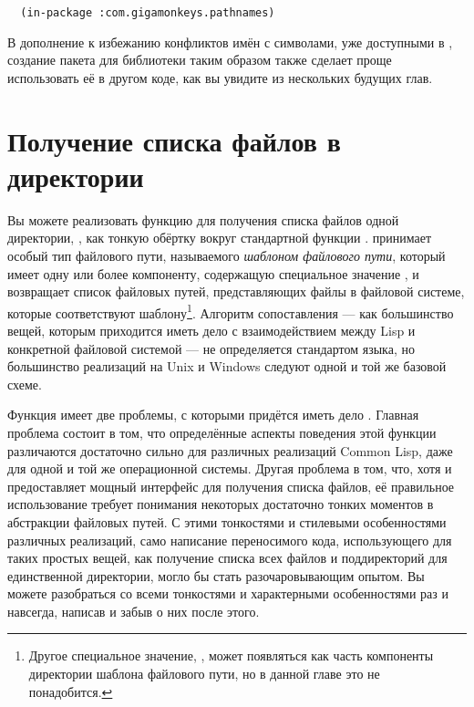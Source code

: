 \begin{lstlisting}
  (in-package :com.gigamonkeys.pathnames)
\end{lstlisting}

В дополнение к избежанию конфликтов имён с символами, уже доступными в ,
создание пакета для библиотеки таким образом также сделает проще использовать её в другом
коде, как вы увидите из нескольких будущих глав.


\section{Получение списка файлов в директории}

Вы можете реализовать функцию для получения списка файлов одной директории,
, как тонкую обёртку вокруг стандартной функции
.  принимает особый тип файлового пути, называемого
\textit{шаблоном файлового пути}, который имеет одну или более компоненту, содержащую
специальное значение , и возвращает список файловых путей, представляющих
файлы в файловой системе, которые соответствуют шаблону\footnote{Другое специальное
  значение, , может появляться как часть компоненты директории
  шаблона файлового пути, но в данной главе это не понадобится.}. Алгоритм сопоставления ---
как большинство вещей, которым приходится иметь дело с взаимодействием между Lisp и
конкретной файловой системой --- не определяется стандартом языка, но большинство реализаций
на Unix и Windows следуют одной и той же базовой схеме.

Функция  имеет две проблемы, с которыми придётся иметь дело
. Главная проблема состоит в том, что определённые аспекты поведения
этой функции различаются достаточно сильно для различных реализаций Common Lisp, даже для
одной и той же операционной системы. Другая проблема в том, что, хотя  и
предоставляет мощный интерфейс для получения списка файлов, её правильное использование
требует понимания некоторых достаточно тонких моментов в абстракции файловых путей. С
этими тонкостями и стилевыми особенностями различных реализаций, само написание
переносимого кода, использующего  для таких простых вещей, как получение
списка всех файлов и поддиректорий для единственной директории, могло бы стать
разочаровывающим опытом. Вы можете разобраться со всеми тонкостями и характерными
особенностями раз и навсегда, написав  и забыв о них после этого.


